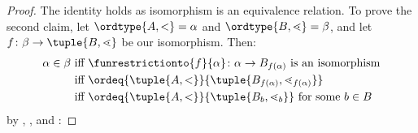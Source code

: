 \documentclass[../../../include/open-logic-section]{subfiles}
\begin{document}
\begin{proof}
	The identity holds as isomorphism is an equivalence relation. To prove the second claim, let $\ordtype{A, <} = \alpha$ and $\ordtype{B, \lessdot} = \beta$, and let $f \colon \beta \to \tuple {B, \lessdot}$ be our isomorphism. Then:
	\begin{align*}
		\alpha \in \beta&\text{ iff }\funrestrictionto{f}{\alpha} \colon \alpha \to B_{f(\alpha)}\text{ is an isomorphism}\\
		&\text{ iff }\ordeq{\tuple{A, <}}{\tuple{B_{f(\alpha)}, \lessdot_{f(\alpha)}}}\\
		&\text{ iff }\ordeq{\tuple{A, <}}{\tuple{B_b, \lessdot_b}}\text{ for some $b \in B$}
	\end{align*}
	by , , and :
\end{proof}
\end{document}
